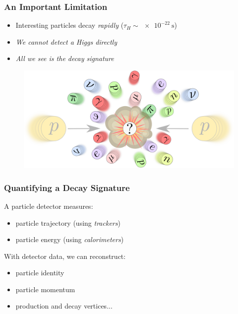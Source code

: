 \documentclass[14pt, t]{beamer}
\begin{document}
\begin{frame}

    \frametitle{An Important Limitation}

    \begin{itemize}
    
        \item Interesting particles decay \textit{rapidly} \hfill ($ \tau_{H} \sim \SI{e-22}{\second} $)

        \item \textit{We cannot detect a Higgs directly}

        \item \textit{All we see is the decay signature}
    
    \end{itemize}

    \begin{figure}
        \centering
        \includegraphics[width=\linewidth]{vector/figures-presentation/collision-question.png}
    \end{figure}

\end{frame}

\begin{frame}
    \frametitle{Quantifying a Decay Signature}
    A particle detector measures:
    \begin{itemize}
    
        \item particle trajectory (using \textit{trackers})

        \item particle energy (using \textit{calorimeters})
    
    \end{itemize}
    \vspace{5mm}
    With detector data, we can reconstruct:
    \begin{itemize}
    
        \item particle identity

        \item particle momentum

        \item production and decay vertices...
    
    \end{itemize}

\end{frame}
\end{document}
